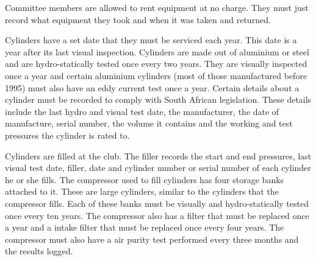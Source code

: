 \documentclass[12pt,a4paper]{article}
\begin{document}
Committee members are allowed to rent equipment at no charge. They must just record
what equipment they took and when it was taken and returned.

Cylinders have a set date that they must be serviced each year. This date is a
year after its last visual inspection. Cylinders are made out of aluminium or
steel and are hydro-statically tested once every two years. They are visually
inspected once a year and certain aluminium cylinders (most of those
manufactured before 1995) must also have an eddy current test once a year.
Certain details about a cylinder must be recorded to comply with South African
legislation. These details include the last hydro and visual test date, the
manufacturer, the date of manufacture, serial number, the volume it contains and
the working and test pressures the cylinder is rated to.

Cylinders are filled at the club. The filler records the start and end
pressures, last visual test date, filler, date and cylinder number or serial
number of each cylinder he or she fills. The compressor used to fill cylinders
has four storage banks attached to it. These are large cylinders, similar to the
cylinders that the compressor fills. Each of these banks must be visually and
hydro-statically tested once every ten years. The compressor also has a filter
that must be replaced once a year and a intake filter that must be replaced once
every four years. The compressor must also have a air purity test performed every
three months and the results logged.
\end{document}
